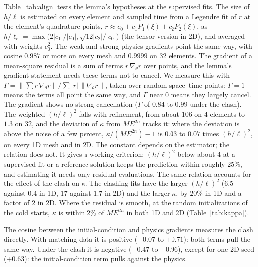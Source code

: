 \documentclass[a4paper,fleqn]{cas-sc}
\begin{document}
Table~\ref{tab:align} tests the lemma's hypotheses at the supervised fits. The size of $h/\ell$ is estimated on every
element and sampled time from a Legendre fit of $r$ at the element's quadrature points,
$r\approx c_0+c_1P_1(\xi)+c_2P_2(\xi)$, as $h/\ell_e=\max\bigl(2|c_1|/|c_0|,\sqrt{12|c_2|/|c_0|}\bigr)$ (the tensor
version in 2D), and averaged with weights $c_0^2$. The weak and strong physics gradients point the same way, with cosine
$0.987$ or more on every mesh and $0.9999$ on $32$ elements. The gradient of a mean-square residual is a sum of terms
$r\,\nabla_\theta r$ over points, and the lemma's gradient statement needs these terms not to cancel. We measure this with
$\Gamma=\bigl\|\sum r\,\nabla_\theta r\bigr\|\big/\sum|r|\,\|\nabla_\theta r\|$, taken over random space--time points:
$\Gamma=1$ means the terms all point the same way, and $\Gamma$ near $0$ means they largely cancel. The gradient shows no
strong cancellation ($\Gamma$ of $0.84$ to $0.99$ under the clash). The weighted $(h/\ell)^2$ falls with refinement, from about $106$ on $4$ elements to
$1.3$ on $32$, and the deviation of $\kappa$ from $ME^{2n}$ tracks it: where the deviation is above the noise of a few
percent, $\kappa/(ME^{2n})-1$ is $0.03$ to $0.07$ times $(h/\ell)^2$, on every 1D mesh and in 2D. The constant depends on
the estimator; the relation does not. It gives a working criterion: $(h/\ell)^2$ below about $4$ at a supervised fit or a
reference solution keeps the prediction within roughly $25\%$, and estimating it needs only residual evaluations. The
same relation accounts for the effect of the clash on $\kappa$. The clashing fits have the larger $(h/\ell)^2$ ($6.5$
against $0.4$ in 1D, $17$ against $1.7$ in 2D) and the larger $\kappa$, by $20\%$ in 1D and a factor of $2$ in 2D. Where the residual is smooth, at the random
initializations of the cold starts, $\kappa$ is within $2\%$ of $ME^{2n}$ in both 1D and 2D (Table~\ref{tab:kappa}).

The cosine between the initial-condition and physics gradients measures the clash directly. With matching data it is
positive ($+0.07$ to $+0.71$): both terms pull the same way. Under the clash it is negative ($-0.47$ to $-0.96$), except for
one 2D seed ($+0.63$): the initial-condition term pulls against the physics.
\end{document}
